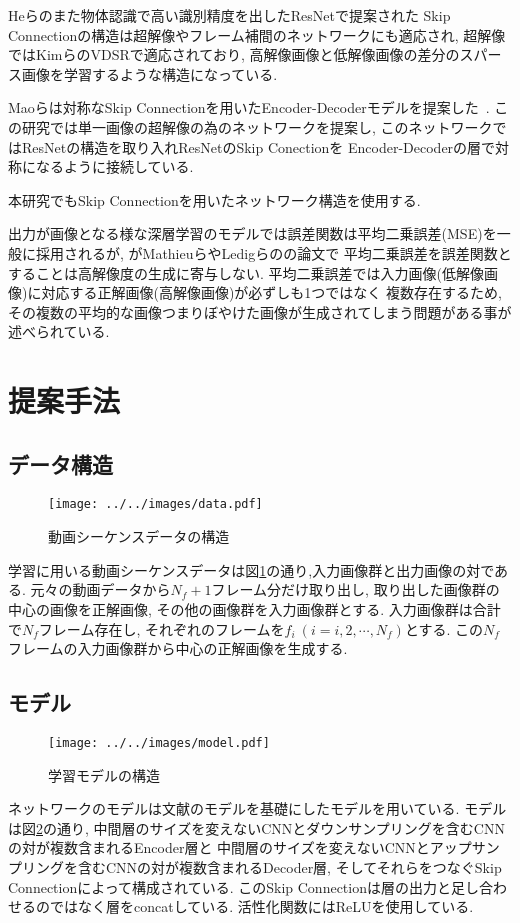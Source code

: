 \documentclass[twocolumn, a4j, uplatex]{jsarticle}
\begin{document}
Heらのまた物体認識で高い識別精度を出したResNet\cite{He_2016_CVPR}で提案された
Skip Connectionの構造は超解像やフレーム補間のネットワークにも適応され,
超解像ではKimらのVDSR\cite{Kim_2016_CVPR}で適応されており,
高解像画像と低解像画像の差分のスパース画像を学習するような構造になっている.

Maoらは対称なSkip Connectionを用いたEncoder-Decoderモデルを提案した~\cite{DBLP:conf/nips/2016}.
この研究では単一画像の超解像の為のネットワークを提案し,
このネットワークではResNet\cite{He_2016_CVPR}の構造を取り入れResNetのSkip Conectionを
Encoder-Decoderの層で対称になるように接続している.

本研究でもSkip Connectionを用いたネットワーク構造を使用する.

出力が画像となる様な深層学習のモデルでは誤差関数は平均二乗誤差(MSE)を一般に採用されるが,
がMathieuら\cite{1511.05440}やLedigらの\cite{Ledig2016arxiv}の論文で
平均二乗誤差を誤差関数とすることは高解像度の生成に寄与しない.
平均二乗誤差では入力画像(低解像画像)に対応する正解画像(高解像画像)が必ずしも1つではなく
複数存在するため, その複数の平均的な画像つまりぼやけた画像が生成されてしまう問題がある事が述べられている.
\section{提案手法}
\subsection{データ構造}
\begin{figure}[htbp]
    \centering
    \texttt{[image: ../../images/data.pdf]}
    \caption{動画シーケンスデータの構造}
    \label{fig:dataset}
\end{figure}

学習に用いる動画シーケンスデータは図\ref{fig:dataset}の通り,入力画像群と出力画像の対である.
元々の動画データから$N_f + 1$フレーム分だけ取り出し,
取り出した画像群の中心の画像を正解画像, その他の画像群を入力画像群とする.
入力画像群は合計で$N_f$フレーム存在し, それぞれのフレームを$f_i~(i = i,  2, \cdots , N_f)$とする.
この$N_f$フレームの入力画像群から中心の正解画像を生成する.
\subsection{モデル}
\begin{figure}[htbp]
    \centering
    \texttt{[image: ../../images/model.pdf]}
    \caption{学習モデルの構造}
    \label{fig:model}
\end{figure}
ネットワークのモデルは文献\cite{DBLP:conf/nips/2016}のモデルを基礎にしたモデルを用いている.
モデルは図\ref{fig:model}の通り, 中間層のサイズを変えないCNNとダウンサンプリングを含むCNNの対が複数含まれるEncoder層と
中間層のサイズを変えないCNNとアップサンプリングを含むCNNの対が複数含まれるDecoder層,
そしてそれらをつなぐSkip Connectionによって構成されている.
このSkip Connectionは層の出力と足し合わせるのではなく層をconcatしている.
活性化関数にはReLUを使用している.
\end{document}
